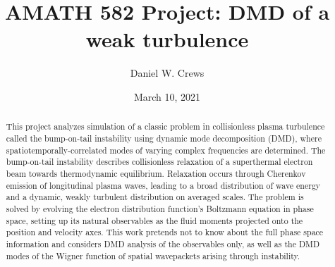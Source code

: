 \documentclass{article}
\title{AMATH 582 Project: DMD of a weak turbulence}
\author{Daniel W. Crews}
\date{March 10, 2021}
\begin{document}
\maketitle

\begin{abstract}
  This project analyzes simulation of a classic problem in collisionless plasma turbulence called the bump-on-tail instability using dynamic mode decomposition (DMD), where spatiotemporally-correlated modes of varying complex frequencies are determined. The bump-on-tail instability describes collisionless relaxation of a superthermal electron beam towards thermodynamic equilibrium. Relaxation occurs through Cherenkov emission of longitudinal plasma waves, leading to a broad distribution of wave energy and a dynamic, weakly turbulent distribution on averaged scales. The problem is solved by evolving the electron distribution function's Boltzmann equation in phase space, setting up its natural observables as the fluid moments projected onto the position and velocity axes. This work pretends not to know about the full phase space information and considers DMD analysis of the observables only, as well as the DMD modes of the Wigner function of spatial wavepackets arising through instability.


\end{abstract}
\end{document}
